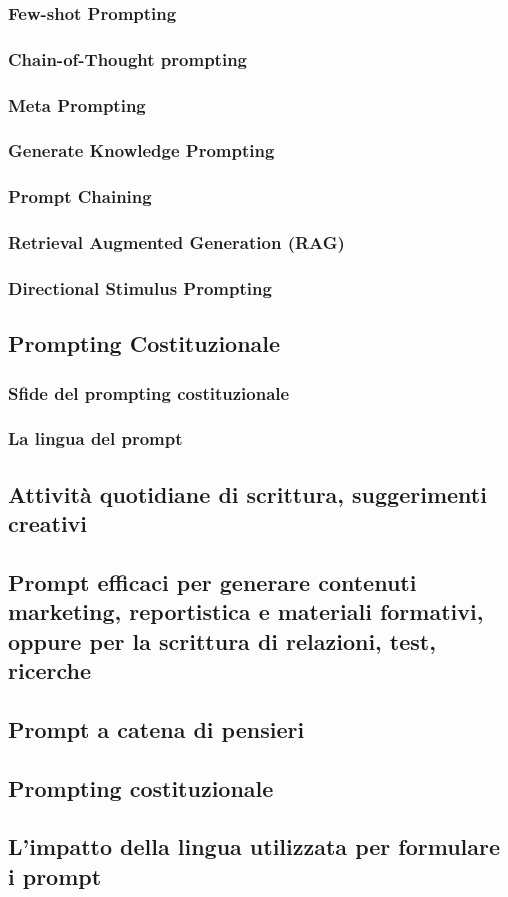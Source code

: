         \subsubsection{Few-shot Prompting}
        \subsubsection{Chain-of-Thought prompting}
        \subsubsection{Meta Prompting}
        \subsubsection{Generate Knowledge Prompting}
        \subsubsection{Prompt Chaining}
        \subsubsection{Retrieval Augmented Generation (RAG)}
        \subsubsection{Directional Stimulus Prompting}
    \subsection{Prompting Costituzionale}
        \subsubsection{Sfide del prompting costituzionale}
        \subsubsection{La lingua del prompt}
        
    \subsection{Attività quotidiane di scrittura, suggerimenti creativi}
    
    \subsection{Prompt efficaci per generare contenuti marketing, reportistica e materiali formativi, oppure per la scrittura di relazioni, test, ricerche}
    
    \subsection{Prompt a catena di pensieri}
    
    \subsection{Prompting costituzionale}
    
    \subsection{L'impatto della lingua utilizzata per formulare i prompt }
